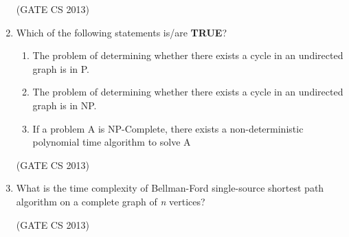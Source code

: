 \documentclass[a4paper, 11pt]{article}
\begin{document}
\begin{enumerate}
    

    \hfill (GATE CS 2013)
    
    \item Which of the following statements is/are \textbf{TRUE}? 
    \begin{enumerate}[label=\arabic*.]
        \item The problem of determining whether there exists a cycle in an undirected graph is in P. 
        \item The problem of determining whether there exists a cycle in an undirected graph is in NP. 
        \item If a problem A is NP-Complete, there exists a non-deterministic polynomial time algorithm to solve A
    \end{enumerate}
    \begin{enumerate}
    \end{enumerate}

    \hfill (GATE CS 2013)

    \item What is the time complexity of Bellman-Ford single-source shortest path algorithm on a complete graph of \textit{n} vertices? 
    \begin{enumerate}
    \end{enumerate}

    \hfill (GATE CS 2013)


\end{enumerate}
\end{document}
